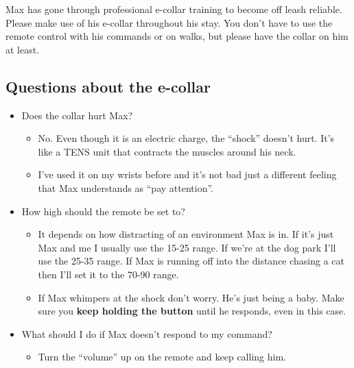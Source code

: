 \documentclass[pdftex,12pt]{article}
\begin{document}
Max has gone through professional e-collar training to become off leash reliable.
Please make use of his e-collar throughout his stay.
You don't have to use the remote control with his commands or on walks,
but please have the collar on him at least.

\subsection{Questions about the e-collar}

\begin{itemize}
    \item Does the collar hurt Max?
        \begin{itemize}
            \item No. Even though it is an electric charge, the ``shock'' doesn't hurt.
                It's like a TENS unit that contracts the muscles around his neck.
            \item I've used it on my wrists before and it's not bad just
                a different feeling that Max understands as ``pay attention''.
        \end{itemize}
    \item How high should the remote be set to?
        \begin{itemize}
            \item It depends on how distracting of an environment Max is in.
                If it's just Max and me I usually use the 15-25 range.
                If we're at the dog park I'll use the 25-35 range.
                If Max is running off into the distance chasing a cat then I'll set it to the 70-90
                range.
            \item If Max whimpers at the shock don't worry.
                He's just being a baby.
                Make sure you \textbf{keep holding the button} until he responds, even in this case.
        \end{itemize}
    \item What should I do if Max doesn't respond to my command?
        \begin{itemize}
            \item Turn the ``volume'' up on the remote and keep calling him.
        \end{itemize}
\end{itemize}
\end{document}
